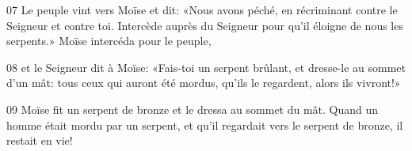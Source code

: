 
07 Le peuple vint vers Moïse et dit: «Nous avons péché, en récriminant contre le Seigneur et contre toi. Intercède auprès du Seigneur pour qu’il éloigne de nous les serpents.» Moïse intercéda pour le peuple,

08 et le Seigneur dit à Moïse: «Fais-toi un serpent brûlant, et dresse-le au sommet d’un mât: tous ceux qui auront été mordus, qu’ils le regardent, alors ils vivront!»

09 Moïse fit un serpent de bronze et le dressa au sommet du mât. Quand un homme était mordu par un serpent, et qu’il regardait vers le serpent de bronze, il restait en vie!